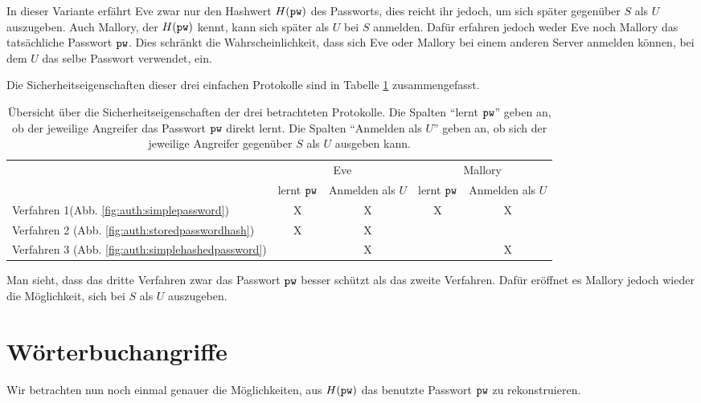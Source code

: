 In dieser Variante erfährt Eve zwar nur den Hashwert $H(\texttt{pw})$ des
Passworts, dies reicht ihr jedoch, um sich später gegenüber $S$ als $U$
auszugeben. Auch Mallory, der $H(\texttt{pw})$ kennt, kann sich später als $U$
bei $S$ anmelden. Dafür erfahren jedoch weder Eve noch Mallory das
tatsächliche Passwort $\texttt{pw}$. Dies schränkt die Wahrscheinlichkeit, dass
sich Eve oder Mallory bei einem anderen Server anmelden können, bei dem
$U$ das selbe Passwort verwendet, ein.

Die Sicherheitseigenschaften dieser drei einfachen Protokolle sind in
Tabelle \ref{table:auth:overview} zusammengefasst.\\
\begin{table}[h]
	\begin{center}
		\begin{tabular}{l||c|c|c|c} 
                  & \multicolumn{2}{c|}{Eve} & \multicolumn{2}{|c}{Mallory}\\ 
                  & lernt $\texttt{pw}$ & Anmelden als $U$ & lernt $\texttt{pw}$ & Anmelden als $U$
                  \\\hline \hline 
                  Verfahren 1(Abb. \ref{fig:auth:simplepassword}) & X & X & X & X \\\hline
                  Verfahren 
                  2 (Abb. \ref{fig:auth:storedpasswordhash}) & X & X & & \\\hline
                  Verfahren 3 (Abb. \ref{fig:auth:simplehashedpassword}) & & X & & X \\
		\end{tabular}
              \end{center}
              \caption{Übersicht über die Sicherheitseigenschaften der drei
                betrachteten Protokolle. Die Spalten "`lernt $\texttt{pw}$"' geben an, ob der
                jeweilige Angreifer das Passwort $\texttt{pw}$ direkt lernt. Die Spalten
"`Anmelden als $U$"' geben an, ob sich der jeweilige Angreifer gegenüber
$S$ als $U$ ausgeben kann.}
	\label{table:auth:overview}
\end{table}

Man sieht, dass das dritte Verfahren zwar das Passwort $\texttt{pw}$ besser
schützt als das zweite Verfahren. Dafür eröffnet es Mallory jedoch
wieder die Möglichkeit, sich bei $S$ als $U$ auszugeben.

\section{Wörterbuchangriffe}

Wir betrachten nun noch einmal genauer die Möglichkeiten, aus $H(\texttt{pw})$
das benutzte Passwort $\texttt{pw}$ zu rekonstruieren.


